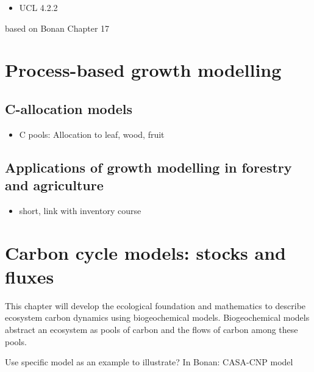 \documentclass[
  oneside]{book}
\providecommand{\tightlist}{%
  \setlength{\itemsep}{0pt}\setlength{\parskip}{0pt}}
\begin{document}

\begin{itemize}
\tightlist
\item
  UCL 4.2.2
\end{itemize}

based on Bonan Chapter 17

\hypertarget{process-based-growth-modelling}{%
\section{Process-based growth modelling}\label{process-based-growth-modelling}}

\hypertarget{c-allocation-models}{%
\subsection{C-allocation models}\label{c-allocation-models}}

\begin{itemize}
\tightlist
\item
  C pools: Allocation to leaf, wood, fruit
\end{itemize}

\hypertarget{applications-of-growth-modelling-in-forestry-and-agriculture}{%
\subsection{Applications of growth modelling in forestry and agriculture}\label{applications-of-growth-modelling-in-forestry-and-agriculture}}

\begin{itemize}
\tightlist
\item
  short, link with inventory course
\end{itemize}

\hypertarget{carbon-cycle-models-stocks-and-fluxes}{%
\section{Carbon cycle models: stocks and fluxes}\label{carbon-cycle-models-stocks-and-fluxes}}

This chapter will develop the ecological foundation and mathematics to describe ecosystem carbon dynamics using biogeochemical models.
Biogeochemical models abstract an ecosystem as pools of carbon and the flows of carbon among these pools.

Use specific model as an example to illustrate? In Bonan: CASA-CNP model
\end{document}
